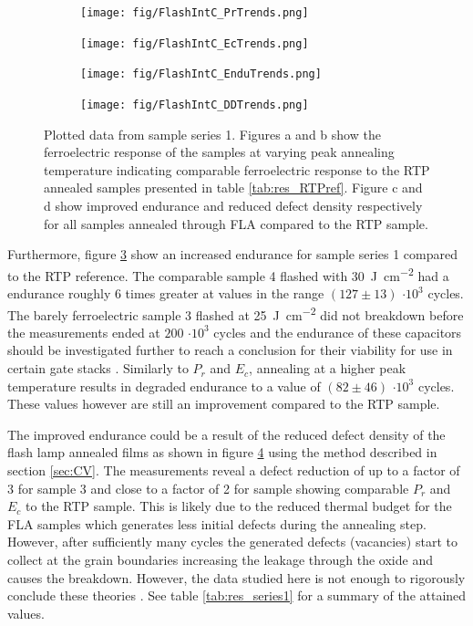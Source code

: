 \documentclass[11pt,twoside]{eitExjobb}
\begin{document}
\begin{figure}[htbp]
    \centering
    \begin{subfigure}{.4\linewidth}
        \texttt{[image: fig/FlashIntC\_PrTrends.png]}
        \caption{}\label{fig:res_IntCPr}
    \end{subfigure}
    \begin{subfigure}{.4\linewidth}
        \texttt{[image: fig/FlashIntC\_EcTrends.png]}
        \caption{}\label{fig:res_IntCEc}
    \end{subfigure}
    \begin{subfigure}{.4\linewidth}
        \texttt{[image: fig/FlashIntC\_EnduTrends.png]}
        \caption{}\label{fig:res_IntCEndu}
    \end{subfigure}
    \begin{subfigure}{.4\linewidth}
        \texttt{[image: fig/FlashIntC\_DDTrends.png]}
        \caption{}\label{fig:res_IntCDD}
    \end{subfigure}
    \caption{Plotted data from sample series 1. Figures a and
        b show the ferroelectric response of the samples at varying peak
        annealing temperature indicating comparable ferroelectric response to
        the RTP annealed samples presented in table \ref{tab:res_RTPref}.
        Figure c and d show improved endurance and reduced defect density
        respectively for all samples annealed through FLA compared to the RTP
        sample.}\label{fig:res_IntC}
\end{figure}

Furthermore, figure \ref{fig:res_IntCEndu} show an increased endurance for
sample series 1 compared to the RTP reference. The comparable sample 4 flashed
with \SI{30}{\joule\per\centi\meter\squared} had a endurance roughly 6 times
greater at values in the range $(127 \pm 13)$ $\cdot 10^3$ cycles. The barely
ferroelectric sample 3 flashed at \SI{25}{\joule\per\centi\meter\squared}
did not breakdown before the measurements ended at $200$ $\cdot 10^3$ cycles and
the endurance of these capacitors should be investigated further to reach a
conclusion for their viability for use in certain gate stacks \cite{dawber2005physics}.
Similarly to $P_r$ and $E_c$, annealing at a higher peak temperature results in degraded
endurance to a value of $(82 \pm 46)$ $\cdot 10^3$ cycles. These values however
are still an improvement compared to the RTP sample.

The improved endurance could be a result of the reduced defect density of the
flash lamp annealed films as shown in figure \ref{fig:res_IntCDD} using the
method described in section \ref{sec:CV}. The measurements reveal a defect
reduction of up to a factor of 3 for sample 3 and close to a factor of 2 for
sample showing comparable $P_r$ and $E_c$ to the RTP sample. This is likely due
to the reduced thermal budget for the FLA samples which generates less initial
defects during the annealing step. However, after sufficiently many cycles the
generated defects (vacancies) start to collect at the  grain boundaries
increasing the leakage through the oxide and causes the breakdown. However,
the data studied here is not enough to rigorously conclude these theories
\cite{pesic2016physical, athle2022improved}. See table \ref{tab:res_series1} for
a summary of the attained values.
\end{document}
